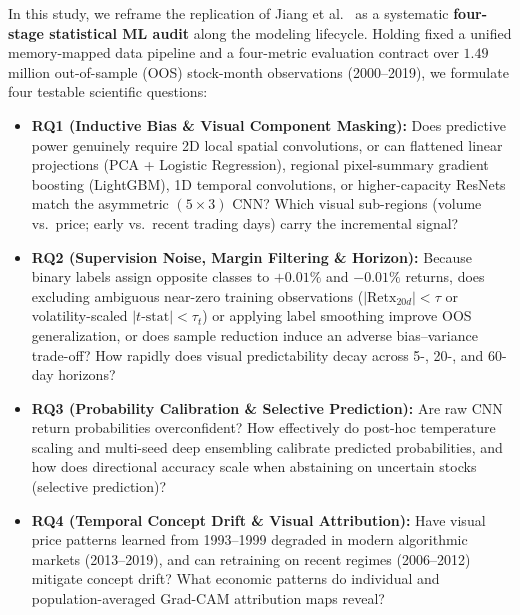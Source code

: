 \documentclass[10pt]{article}
\begin{document}
In this study, we reframe the replication of Jiang et al.\ \cite{jiang2023reimagining} as a systematic \textbf{four-stage statistical ML audit} along the modeling lifecycle. Holding fixed a unified memory-mapped data pipeline and a four-metric evaluation contract over $1.49$ million out-of-sample (OOS) stock-month observations (2000--2019), we formulate four testable scientific questions:
\begin{itemize}[leftmargin=1.6em,itemsep=1.5pt,topsep=2pt]
  \item \textbf{RQ1 (Inductive Bias \& Visual Component Masking):} Does predictive power genuinely require 2D local spatial convolutions, or can flattened linear projections (PCA + Logistic Regression), regional pixel-summary gradient boosting (LightGBM), 1D temporal convolutions, or higher-capacity ResNets match the asymmetric $(5 \times 3)$ CNN? Which visual sub-regions (volume vs.\ price; early vs.\ recent trading days) carry the incremental signal?
  \item \textbf{RQ2 (Supervision Noise, Margin Filtering \& Horizon):} Because binary labels assign opposite classes to $+0.01\%$ and $-0.01\%$ returns, does excluding ambiguous near-zero training observations ($|\text{Retx}_{20d}| < \tau$ or volatility-scaled $|t\text{-stat}| < \tau_t$) or applying label smoothing improve OOS generalization, or does sample reduction induce an adverse bias--variance trade-off? How rapidly does visual predictability decay across 5-, 20-, and 60-day horizons?
  \item \textbf{RQ3 (Probability Calibration \& Selective Prediction):} Are raw CNN return probabilities overconfident? How effectively do post-hoc temperature scaling \cite{guo2017calibration} and multi-seed deep ensembling \cite{lakshminarayanan2017simple} calibrate predicted probabilities, and how does directional accuracy scale when abstaining on uncertain stocks (selective prediction)?
  \item \textbf{RQ4 (Temporal Concept Drift \& Visual Attribution):} Have visual price patterns learned from 1993--1999 degraded in modern algorithmic markets (2013--2019), and can retraining on recent regimes (2006--2012) mitigate concept drift? What economic patterns do individual and population-averaged Grad-CAM \cite{selvaraju2017gradcam} attribution maps reveal?
\end{itemize}

\end{document}
